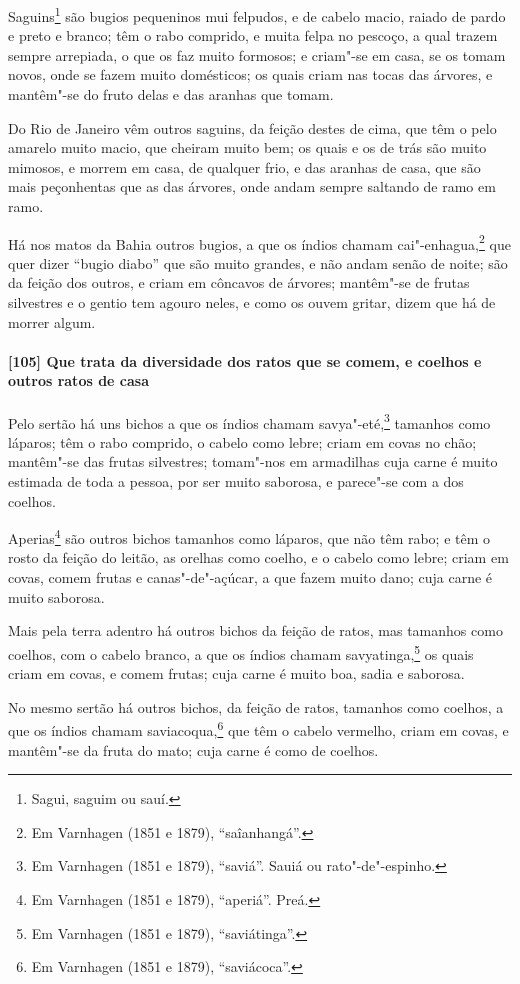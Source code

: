 Saguins\footnote{ Sagui, saguim ou sauí.} são bugios pequeninos mui felpudos, e de cabelo
macio, raiado de pardo e preto e branco; têm o rabo comprido, e muita felpa no pescoço, a
qual trazem sempre arrepiada, o que os faz muito formosos; e criam"-se em casa, se os tomam
novos, onde se fazem muito domésticos; os quais criam nas tocas das árvores, e mantêm"-se
do fruto delas e das aranhas que tomam.

Do Rio de Janeiro vêm outros saguins, da feição destes de cima, que têm o pelo amarelo
muito macio, que cheiram muito bem; os quais e os de trás são muito mimosos, e morrem em
casa, de qualquer frio, e das aranhas de casa, que são mais peçonhentas que as das
árvores, onde andam sempre saltando de ramo em ramo.

Há nos matos da Bahia outros bugios, a que os índios chamam cai"-enhagua,\footnote{ Em
Varnhagen (1851 e 1879), ``saîanhangá''.} que quer dizer ``bugio diabo'' que são muito
grandes, e não andam senão de noite; são da feição dos outros, e criam em côncavos de
árvores; mantêm"-se de frutas silvestres e o gentio tem agouro neles, e como os ouvem
gritar, dizem que há de morrer algum.

\paragraph{[105] Que trata da diversidade dos ratos que se comem, e coelhos e outros ratos
de casa}\quad
Pelo sertão há uns bichos a que os índios chamam savya"-eté,\footnote{ Em Varnhagen (1851 e
1879), ``saviá''. Sauiá ou rato"-de"-espinho.} tamanhos como láparos; têm o rabo comprido,
o cabelo como lebre; criam em covas no chão; mantêm"-se das frutas silvestres; tomam"-nos em
armadilhas cuja carne é muito estimada de toda a pessoa, por ser muito saborosa, e
parece"-se com a dos coelhos.

Aperias\footnote{ Em Varnhagen (1851 e 1879), ``aperiá''. Preá.} são outros bichos
tamanhos como láparos, que não têm rabo; e têm o rosto da feição do leitão, as orelhas
como coelho, e o cabelo como lebre; criam em covas, comem frutas e canas"-de"-açúcar, a que
fazem muito dano; cuja carne é muito saborosa.

Mais pela terra adentro há outros bichos da feição de ratos, mas tamanhos como coelhos,
com o cabelo branco, a que os índios chamam savyatinga,\footnote{ Em Varnhagen (1851 e
1879), ``saviátinga''.} os quais criam em covas, e comem frutas; cuja carne é muito boa,
sadia e saborosa.

No mesmo sertão há outros bichos, da feição de ratos, tamanhos como coelhos, a que os
índios chamam saviacoqua,\footnote{ Em Varnhagen (1851 e 1879), ``saviácoca''.} que têm o
cabelo vermelho, criam em covas, e mantêm"-se da fruta do mato; cuja carne é como de
coelhos.

